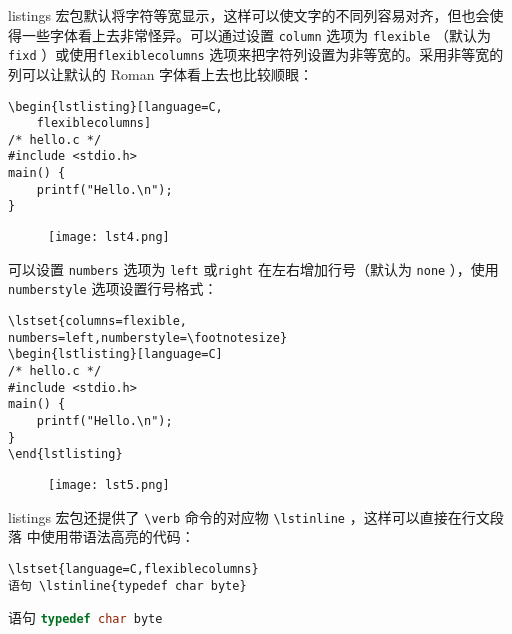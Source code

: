 \vspace{0.1cm}
listings 宏包默认将字符等宽显示，这样可以使文字的不同列容易对齐，但也会使得一些字体看上去非常怪异。可以通过设置 \verb|column| 选项为 \verb|flexible| （默认为 \verb|fixd| ）或使用\verb|flexiblecolumns| 选项来把字符列设置为非等宽的。采用非等宽的列可以让默认的 Roman 字体看上去也比较顺眼：

\begin{minipage}[t]{0.45\textwidth}
\vspace{0.1cm}
\begin{verbatim}
\begin{lstlisting}[language=C,
    flexiblecolumns]
/* hello.c */
#include <stdio.h>
main() {
    printf("Hello.\n");
}
\end{verbatim}
\end{minipage}
\hfill
\begin{minipage}[t]{0.45\textwidth}
    \begin{figure}[H]
        \centering
        \texttt{[image: lst4.png]}
    \end{figure}
\end{minipage}

可以设置 \verb|numbers| 选项为 \verb|left| 或\verb|right| 在左右增加行号（默认为 \verb|none| ），使用 \verb|numberstyle| 选项设置行号格式：

\begin{minipage}[t]{0.45\textwidth}
\vspace{0.1cm}
\begin{verbatim}
\lstset{columns=flexible,
numbers=left,numberstyle=\footnotesize}
\begin{lstlisting}[language=C]
/* hello.c */
#include <stdio.h>
main() {
    printf("Hello.\n");
}
\end{lstlisting}
\end{verbatim}
\end{minipage}
\hfill
\begin{minipage}[t]{0.45\textwidth}
    \begin{figure}[H]
        \centering
        \texttt{[image: lst5.png]}
    \end{figure}
\end{minipage}

\vspace{0.1cm}
listings 宏包还提供了 \verb|\verb| 命令的对应物 \verb|\lstinline| ，这样可以直接在行文段落
中使用带语法高亮的代码：

\begin{minipage}[t]{0.45\textwidth}
\begin{lstlisting}
\lstset{language=C,flexiblecolumns}
语句 \lstinline{typedef char byte}
\end{lstlisting}
\end{minipage}
\hfill
\begin{minipage}[t]{0.45\textwidth}
    语句 \lstinline[language=C,flexiblecolumns,keywordstyle = \bfseries]{typedef char byte}
\end{minipage}

